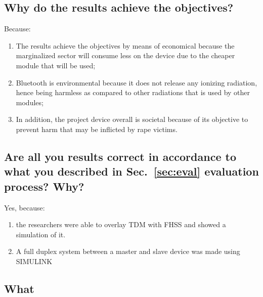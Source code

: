 \subsection{Why do the results achieve the objectives?}
Because:
\begin{enumerate}
	\item The results achieve the objectives by means of economical because the marginalized sector will consume less on the device due to the cheaper module that will be used; 
	
	\item Bluetooth is environmental because it does not release any ionizing radiation, hence being harmless as compared to other radiations that is used by other modules;
	
	\item In addition, the project device overall is societal because of its objective to prevent harm that may be inflicted by rape victims.
	
\end{enumerate}

\subsection{Are all you results correct  in accordance to what you described in Sec.~\ref{sec:eval} evaluation process? Why?} 
Yes, because:
\begin{enumerate}
	\item the researchers were able to overlay TDM with FHSS and showed a simulation of it.
	\item A full duplex system between a master and slave device was made using SIMULINK
\end{enumerate}

\subsection{What}

